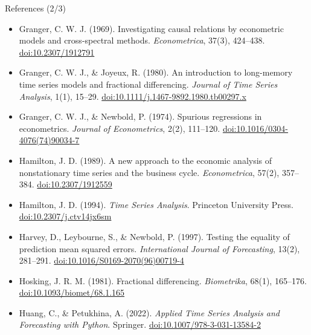 \begin{frame}{References (2/3)}
\itemsize{\scriptsize}
\begin{itemize}
    \item Granger, C. W. J. (1969). Investigating causal relations by econometric models and cross-spectral methods. \textit{Econometrica}, 37(3), 424--438. \href{https://doi.org/10.2307/1912791}{doi:10.2307/1912791}
    \item Granger, C. W. J., \& Joyeux, R. (1980). An introduction to long-memory time series models and fractional differencing. \textit{Journal of Time Series Analysis}, 1(1), 15--29. \href{https://doi.org/10.1111/j.1467-9892.1980.tb00297.x}{doi:10.1111/j.1467-9892.1980.tb00297.x}
    \item Granger, C. W. J., \& Newbold, P. (1974). Spurious regressions in econometrics. \textit{Journal of Econometrics}, 2(2), 111--120. \href{https://doi.org/10.1016/0304-4076(74)90034-7}{doi:10.1016/0304-4076(74)90034-7}
    \item Hamilton, J. D. (1989). A new approach to the economic analysis of nonstationary time series and the business cycle. \textit{Econometrica}, 57(2), 357--384. \href{https://doi.org/10.2307/1912559}{doi:10.2307/1912559}
    \item Hamilton, J. D. (1994). \textit{Time Series Analysis}. Princeton University Press. \href{https://doi.org/10.2307/j.ctv14jx6sm}{doi:10.2307/j.ctv14jx6sm}
    \item Harvey, D., Leybourne, S., \& Newbold, P. (1997). Testing the equality of prediction mean squared errors. \textit{International Journal of Forecasting}, 13(2), 281--291. \href{https://doi.org/10.1016/S0169-2070(96)00719-4}{doi:10.1016/S0169-2070(96)00719-4}
    \item Hosking, J. R. M. (1981). Fractional differencing. \textit{Biometrika}, 68(1), 165--176. \href{https://doi.org/10.1093/biomet/68.1.165}{doi:10.1093/biomet/68.1.165}
    \item Huang, C., \& Petukhina, A. (2022). \textit{Applied Time Series Analysis and Forecasting with Python}. Springer. \href{https://doi.org/10.1007/978-3-031-13584-2}{doi:10.1007/978-3-031-13584-2}
\end{itemize}
\end{frame}

